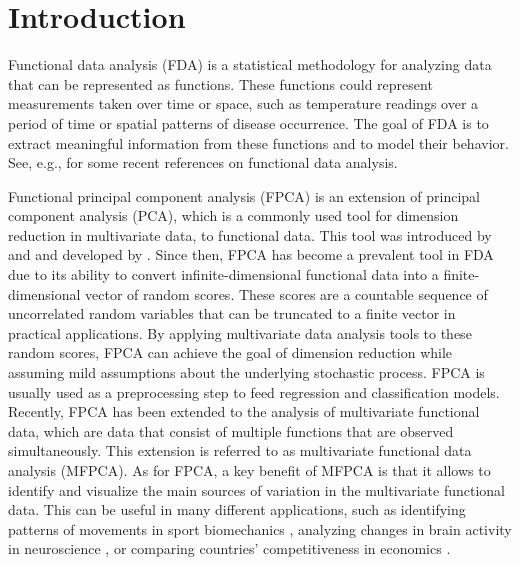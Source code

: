 \section{Introduction} %
\label{sec:introduction}

Functional data analysis (FDA) is a statistical methodology for analyzing data that can be represented as functions. These functions could represent measurements taken over time or space, such as temperature readings over a period of time or spatial patterns of disease occurrence. The goal of FDA is to extract meaningful information from these functions and to model their behavior. See, e.g., \cite{ramsayFunctionalDataAnalysis2005,horvathInferenceFunctionalData2012,wangFunctionalDataAnalysis2016,kokoszkaSpecialIssueFunctional2017} for some recent references on functional data analysis.

Functional principal component analysis (FPCA) is an extension of principal component analysis (PCA), which is a commonly used tool for dimension reduction in multivariate data, to functional data. This tool was introduced by \cite{karhunenUeberLineareMethoden1947} and \cite{loeveFonctionsAleatoiresStationnaires1945} and developed by \cite{dauxoisAsymptoticTheoryPrincipal1982}. Since then, FPCA has become a prevalent tool in FDA due to its ability to convert infinite-dimensional functional data into a finite-dimensional vector of random scores. These scores are a countable sequence of uncorrelated random variables that can be truncated to a finite vector in practical applications. By applying multivariate data analysis tools to these random scores, FPCA can achieve the goal of dimension reduction while assuming mild assumptions about the underlying stochastic process. FPCA is usually used as a preprocessing step to feed regression and classification models. Recently, FPCA has been extended to the analysis of multivariate functional data, which are data that consist of multiple functions that are observed simultaneously. This extension is referred to as multivariate functional data analysis (MFPCA). As for FPCA, a key benefit of MFPCA is that it allows to identify and visualize the main sources of variation in the multivariate functional data. This can be useful in many different applications, such as identifying patterns of movements in sport biomechanics \citep{warmenhovenBivariateFunctionalPrincipal2019}, analyzing changes in brain activity in neuroscience \citep{songSparseMultivariateFunctional2022}, or comparing  countries' competitiveness in economics \citep{krzyskoMultidimensionalEconomicIndicators2022}.

